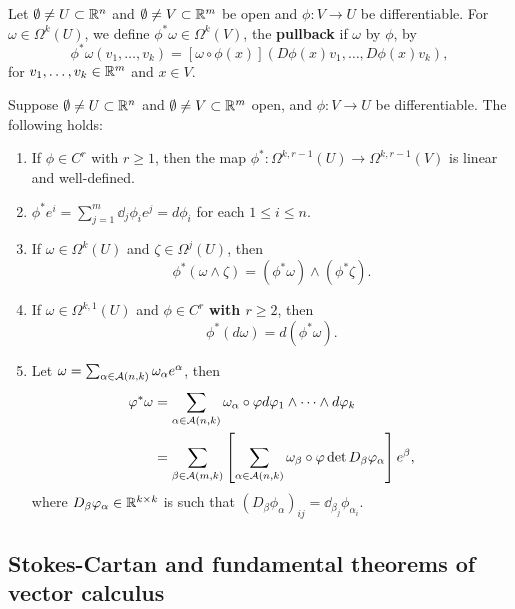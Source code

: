 \documentclass[a4paper]{article}
\begin{document}
\begin{defi}[pullback]
Let $\emptyset \neq U \subset \mathbb{R}^n$ and $\emptyset \neq V 
\subset \mathbb{R}^m$ be open and $\phi : V \to U$ be differentiable.
For $\omega \in \Omega^k(U)$, we define $\phi^* \omega \in 
\Omega^k(V)$, the \textbf{pullback} if $\omega$ by $\phi$, 
by 
\[
\phi^* \omega (v_1, \dots, v_k) = 
[\omega \circ \phi(x)] (D \phi(x) v_1, \dots, D \phi(x) v_k),
\]
for $v_1, \dots, v_k \in \mathbb{R}^m$ and $x \in V$.
\end{defi}

\begin{thm}
Suppose $\emptyset \neq U \subset \mathbb{R}^n$ and 
$\emptyset \neq V \subset \mathbb{R}^m$ open, and
$\phi : V \to U$ be differentiable. 
The following holds: 
\begin{enumerate}
\item If $\phi \in C^r$ with $r \geq 1$, 
then the map $\phi^* : \Omega^{k, r-1}(U) 
\to \Omega^{k, r-1}(V)$ is linear and well-defined.

\item $\phi^* e^i = \sum_{j=1}^m \dd_j \phi_i e^j = d \phi_i$
for each $1 \leq i \leq n$.

\item If $\omega \in \Omega^k(U)$ and $\zeta \in \Omega^j(U)$, 
then 
\[
\phi^* (\omega \wedge \zeta) = (\phi^* \omega) \wedge 
(\phi^* \zeta).
\]

\item If $\omega \in \Omega^{k, 1} (U)$ and $\phi \in C^r$ 
\textbf{with $r \geq 2$}, then 
\[
\phi^* (d \omega) = d (\phi^* \omega).
\]

\item Let $\omega = \sum_{\alpha \in \mathcal{A}(n, k)} 
\omega_\alpha e^\alpha$, then 
\[
\begin{aligned}
\varphi^* \omega
&= \sum_{\alpha \in \mathcal{A}(n, k)} \omega_\alpha \circ \varphi 
d \varphi_1 \wedge \dots \wedge d \varphi_k \\
&= \sum_{\beta \in \mathcal{A}(m, k)} 
\left[ \sum_{\alpha \in \mathcal{A}(n, k)} \omega_\beta \circ \varphi 
\det D_\beta \varphi_\alpha \right] e^\beta,
\end{aligned}
\]
where $D_\beta \varphi_\alpha \in \mathbb{R}^{k \times k}$ is such that 
$(D_\beta \phi_\alpha)_{ij} = \dd_{\beta_j} \phi_{\alpha_i}$.
\end{enumerate}
\end{thm}

\subsection{Stokes-Cartan and fundamental theorems
of vector calculus}
\end{document}
